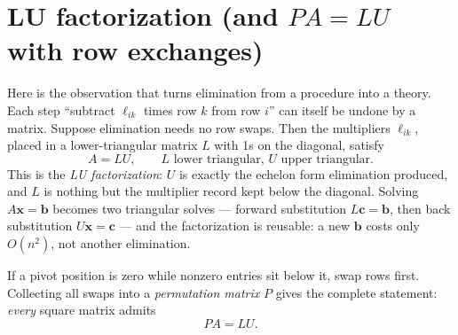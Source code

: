\section{LU factorization (and \texorpdfstring{$PA=LU$}{PA = LU} with row exchanges)}\label{sec:lu}

Here is the observation that turns elimination from a procedure into a theory. Each step ``subtract $\ell_{ik}$ times row $k$ from row $i$'' can itself be undone by a matrix. Suppose elimination needs no row swaps. Then the multipliers $\ell_{ik}$, placed in a lower-triangular matrix $L$ with 1s on the diagonal, satisfy
\[
  A = LU, \qquad\text{$L$ lower triangular, $U$ upper triangular.}
\]
This is the \emph{LU factorization}: $U$ is exactly the echelon form elimination produced, and $L$ is nothing but the multiplier record kept below the diagonal. Solving $A\mathbf{x}=\mathbf{b}$ becomes two triangular solves — forward substitution $L\mathbf{c}=\mathbf{b}$, then back substitution $U\mathbf{x}=\mathbf{c}$ — and the factorization is reusable: a new $\mathbf{b}$ costs only $O(n^2)$, not another elimination.

If a pivot position is zero while nonzero entries sit below it, swap rows first. Collecting all swaps into a \emph{permutation matrix} $P$ gives the complete statement: \emph{every} square matrix admits
\[
  PA = LU.
\]

